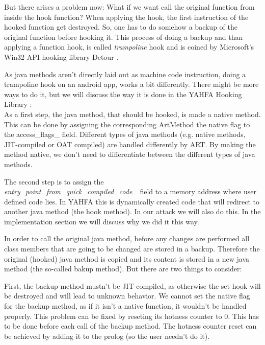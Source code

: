 But there arises a problem now: What if we want call the original function from inside the hook function? When applying the hook, the first instruction of the hooked function get destroyed. So, one has to do somehow a backup of the original function before hooking it. This process of doing a backup and than applying a function hook, is called \emph{trampoline} hook and is coined by Microsoft's Win32 API hooking library Detour \cite{detours-binary-interception-of-win32-functions}.

As java methods aren't directly laid out as machine code instruction, doing a trampoline hook on an android app, works a bit differently. There might be more ways to do it, but we will discuss the way it is done in the YAHFA Hooking Library \cite{YahfaGithub}:\\

As a first step, the java method, that should be hooked, is made a native method. This can be done by assigning the corresponding ArtMethod the native flag to the access\_flags\_ field. Different types of java methods (e.g. native methods, JIT-compiled or OAT compiled) are handled differently by ART. By making the method native, we don't need to differentiate between the different types of java methods.

The second step is to assign the \\\emph{entry\_point\_from\_quick\_compiled\_code\_} field to a memory address where user defined code lies. In YAHFA this is dynamically created code that will redirect to another java method (the hook method). In our attack we will also do this. In the implementation section we will discuss why we did it this way.

In order to call the original java method, before any changes are performed all class members that are going to be changed are stored in a backup. 
Therefore the original (hooked) java method is copied and its content is stored in a new java method (the so-called bakup method).
But there are two things to consider:

First, the backup method mustn't be JIT-compiled, as otherwise the set hook will be destroyed and will lead to unknown behavior. 
We cannot set the native flag for the backup method, as if it isn't a native function, it wouldn't be handled properly.
This problem can be fixed by reseting its hotness counter to 0. This has to be done before each call of the backup method. The hotness counter reset can be achieved by adding it to the prolog (so the user needn't do it).

